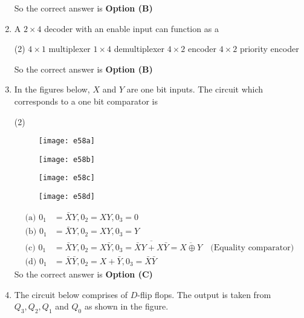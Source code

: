 \begin{enumerate}
\begin{answer}
So the correct answer is \textbf{Option (B)}
\end{answer}
	\item A $2 \times 4$ decoder with an enable input can function as a
{	}
\begin{tasks}(2)
\task[\textbf{A.}] $4 \times 1$ multiplexer
\task[\textbf{B.}] $1 \times 4$ demultiplexer
\task[\textbf{C.}] $4 \times 2$ encoder
\task[\textbf{D.}] $4 \times 2$ priority encoder
\end{tasks}
\begin{answer}
So the correct answer is \textbf{Option (B)}
\end{answer}
	\item In the figures below, $X$ and $Y$ are one bit inputs. The circuit which corresponds to a one bit comparator is
{	}
\begin{tasks}(2)
\task[\textbf{A.}] \begin{figure}[H]
	\centering
	\texttt{[image: e58a]}
\end{figure}
\task[\textbf{B.}] \begin{figure}[H]
	\centering
	\texttt{[image: e58b]}
\end{figure}
\task[\textbf{C.}] \begin{figure}[H]
	\centering
	\texttt{[image: e58c]}
\end{figure}
\task[\textbf{D.}] \begin{figure}[H]
	\centering
	\texttt{[image: e58d]}
\end{figure}
\end{tasks}
\begin{answer}
\begin{align*}
\text{(a) }0_{1}&=\bar{X} Y, 0_{2}=X Y, 0_{3}=0\\
\text{(b) }0_{1}&=\bar{X} Y, 0_{2}=X Y, 0_{3}=Y\\
\text{(c) }0_{1}&=\bar{X} Y, 0_{2}=X \bar{Y}, 0_{3}=\overline{\bar{X} Y+X \bar{Y}}=\overline{X \oplus Y}\quad\text{(Equality comparator)}\\
\text{(d) }0_{1}&=\bar{X} \bar{Y}, 0_{2}=X+\bar{Y}, 0_{3}=\bar{X} \bar{Y}
\end{align*}
So the correct answer is \textbf{Option (C)}
\end{answer}
	\item The circuit below comprises of $D$-flip flops. The output is taken from $Q_{3}, Q_{2}, Q_{1}$ and $Q_{0}$ as shown in the figure.\\

\end{enumerate}

